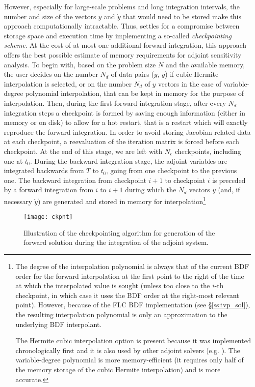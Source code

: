 However, especially for large-scale problems and long integration
intervals, the number and size of the vectors $y$ and ${\dot y}$ that would
need to be stored make this approach computationally intractable.
Thus, {\idas} settles for a compromise between storage space and execution time by
implementing a so-called {\em checkpointing scheme}. At the cost of at most one
additional forward integration, this approach offers the best possible estimate
of memory requirements for adjoint sensitivity analysis. To begin with, based on
the problem size $N$ and the available memory, the user decides on the number
$N_d$ of data pairs ($y$, ${\dot y}$) if cubic Hermite interpolation is selected,
or on the number $N_d$ of $y$ vectors in the case of variable-degree polynomial
interpolation, that can be kept in memory for the purpose of interpolation.
Then, during the first forward integration stage, after
every $N_d$ integration steps a checkpoint is formed by saving enough information
(either in memory or on disk) to allow for a hot restart, that is a restart
which will exactly reproduce the forward integration. In order to avoid storing
Jacobian-related data at each checkpoint, a reevaluation of the iteration matrix
is forced before each checkpoint. At the end of this stage, we are left with $N_c$
checkpoints, including one at $t_0$.
During the backward integration stage, the adjoint variables are integrated
backwards from $T$ to $t_0$, going from one checkpoint to the previous one.
The backward integration from checkpoint $i+1$ to checkpoint $i$ is preceded
by a forward integration from $i$ to $i+1$ during which the $N_d$ vectors
$y$ (and, if necessary ${\dot y}$) are generated and stored in memory for
interpolation\footnote{The degree of the
interpolation polynomial is always that of the current BDF order for the forward
interpolation at the first point to the right of the time at which the interpolated
value is sought (unless too close to the $i$-th checkpoint, in which case it uses
the BDF order at the right-most relevant point). However, because of the FLC BDF
implementation (see \S\ref{ss:ivp_sol}), the resulting interpolation polynomial
is only an approximation to the underlying BDF interpolant.

The Hermite cubic interpolation option is present because it was implemented
chronologically first and it is also used by other adjoint solvers (e.g. {\daspkadjoint}).
The variable-degree polynomial is more memory-efficient (it requires only half of the
memory storage of the cubic Hermite interpolation) and is more accurate.}
%
\begin{figure}
\centerline{\texttt{[image: ckpnt]}}
\caption {Illustration of the checkpointing algorithm for generation of
  the forward solution during the integration of the adjoint system.}
\label{f:ckpnt}
\end{figure}

